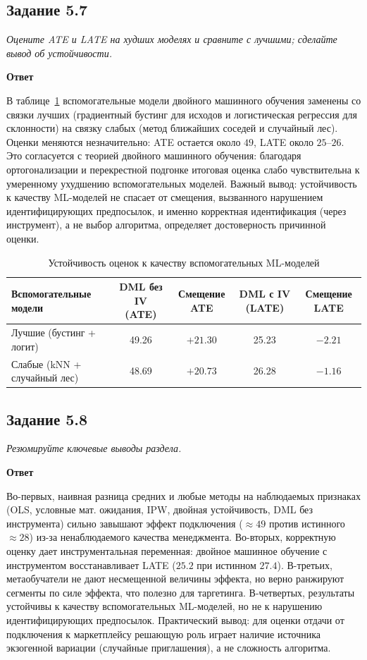 \documentclass[12pt,a4paper]{article}
\newcommand{\zadanie}[2]{\subsection*{Задание #1}\begingroup\itshape #2\par\endgroup\medskip}
\newcommand{\otvet}{\par\noindent\textbf{Ответ}\par\medskip}
\begin{document}
\zadanie{5.7}{Оцените ATE и LATE на худших моделях и сравните с лучшими; сделайте вывод об устойчивости.}
\otvet
В таблице~\ref{tab:robust} вспомогательные модели двойного машинного обучения заменены со связки лучших (градиентный бустинг для исходов и логистическая регрессия для склонности) на связку слабых (метод ближайших соседей и случайный лес). Оценки меняются незначительно: ATE остается около $49$, LATE около $25$--$26$. Это согласуется с теорией двойного машинного обучения: благодаря ортогонализации и перекрестной подгонке итоговая оценка слабо чувствительна к умеренному ухудшению вспомогательных моделей. Важный вывод: устойчивость к качеству ML-моделей не спасает от смещения, вызванного нарушением идентифицирующих предпосылок, и именно корректная идентификация (через инструмент), а не выбор алгоритма, определяет достоверность причинной оценки.

\begin{table}[H]\centering\small
\caption{Устойчивость оценок к качеству вспомогательных ML-моделей}\label{tab:robust}
\begin{tabular}{lcccc}\toprule
Вспомогательные модели & DML без IV (ATE) & Смещение ATE & DML с IV (LATE) & Смещение LATE\\\midrule
Лучшие (бустинг + логит) & 49.26 & $+21.30$ & 25.23 & $-2.21$\\
Слабые (kNN + случайный лес) & 48.69 & $+20.73$ & 26.28 & $-1.16$\\\bottomrule
\end{tabular}
\end{table}

\zadanie{5.8}{Резюмируйте ключевые выводы раздела.}
\otvet
Во-первых, наивная разница средних и любые методы на наблюдаемых признаках (OLS, условные мат. ожидания, IPW, двойная устойчивость, DML без инструмента) сильно завышают эффект подключения ($\approx 49$ против истинного $\approx 28$) из-за ненаблюдаемого качества менеджмента. Во-вторых, корректную оценку дает инструментальная переменная: двойное машинное обучение с инструментом восстанавливает LATE ($25.2$ при истинном $27.4$). В-третьих, метаобучатели не дают несмещенной величины эффекта, но верно ранжируют сегменты по силе эффекта, что полезно для таргетинга. В-четвертых, результаты устойчивы к качеству вспомогательных ML-моделей, но не к нарушению идентифицирующих предпосылок. Практический вывод: для оценки отдачи от подключения к маркетплейсу решающую роль играет наличие источника экзогенной вариации (случайные приглашения), а не сложность алгоритма.
\end{document}
